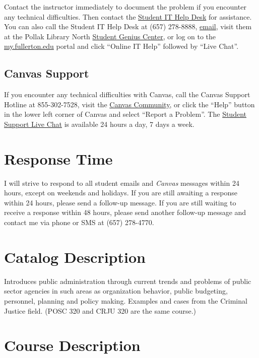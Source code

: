 \documentclass[12pt, letterpaper]{article}
\begin{document}
Contact the instructor immediately to document the problem if you encounter any technical difficulties. Then contact the \href{http://www.fullerton.edu/it/students/helpdesk/index.php}{Student IT Help Desk} for assistance. You can also call the Student IT Help Desk at (657) 278-8888, \href{mailto:StudentITHelpDesk@fullerton.edu}{email}, visit them at the Pollak Library North \href{http://www.fullerton.edu/it/students/sgc/index.php}{Student Genius Center}, or log on to the \href{http://my.fullerton.edu/}{my.fullerton.edu} portal and click ``Online IT Help'' followed by ``Live Chat''.

\subsection*{Canvas Support}

If you encounter any technical difficulties with Canvas, call the Canvas Support Hotline at 855-302-7528, visit the \href{https://community.canvaslms.com/docs/DOC-10720-67952720329}{Canvas Community}, or click the ``Help'' button in the lower left corner of Canvas and select ``Report a Problem''. The \href{https://cases.canvaslms.com/liveagentchat?chattype=student&sfid=001A000000YzcwQIAR}{Student Support Live Chat} is available 24 hours a day, 7 days a week.

\section*{Response Time} I will strive to respond to all student emails and \emph{Canvas} messages within 24 hours, except on weekends and holidays. If you are still awaiting a response within 24 hours, please send a follow-up message. If you are still waiting to receive a response within 48 hours, please send another follow-up message and contact me via phone or SMS at (657) 278-4770.

\section*{Catalog Description}

Introduces public administration through current trends and problems of public sector agencies in such areas as organization behavior, public budgeting, personnel, planning and policy making. Examples and cases from the Criminal Justice field. (POSC 320 and CRJU 320 are the same course.)

\section*{Course Description}
\end{document}
